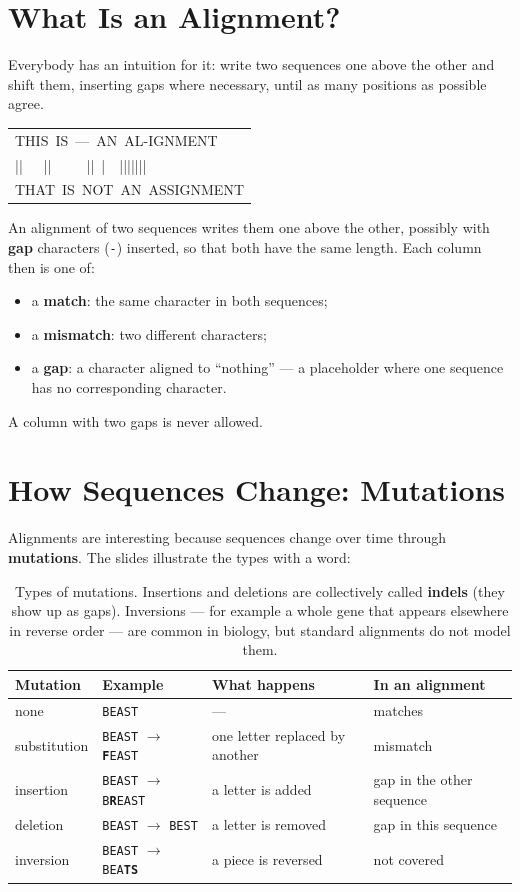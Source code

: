 \documentclass[11pt, oneside]{book}
\makeatletter
\newcommand{\seq}[1]{\texttt{#1}}
\newcommand{\alnblock}[1]{%
  \par\smallskip
  {\centering\ttfamily\small
   \begin{tabular}{@{}l@{}}#1\end{tabular}\par}%
  \smallskip}
\newcommand{\mm}[1]{\textcolor{thm@frame}{\textbf{#1}}}  %
\let\originalsection\section
\renewcommand{\section}{\Needspace{7\baselineskip}\originalsection}
\makeatother
\begin{document}
\section{What Is an Alignment?}

Everybody has an intuition for it: write two sequences one above the other
and shift them, inserting gaps where necessary, until as many positions as
possible agree.

\alnblock{%
THIS~IS~---~AN~AL-IGNMENT\\
||~~~||~~~~~||~|~~|||||||\\
THAT~IS~NOT~AN~ASSIGNMENT}

\begin{defbox}[title={Pairwise alignment}]
An alignment of two sequences writes them one above the other, possibly with
\textbf{gap} characters (\seq{-}) inserted, so that both have the same length.
Each column then is one of:
\begin{itemize}
  \item a \textbf{match}: the same character in both sequences;
  \item a \textbf{mismatch}: two different characters;
  \item a \textbf{gap}: a character aligned to ``nothing'' --- a placeholder
    where one sequence has no corresponding character.
\end{itemize}
A column with two gaps is never allowed.
\end{defbox}

\section{How Sequences Change: Mutations}

Alignments are interesting because sequences change over time through
\textbf{mutations}. The slides illustrate the types with a word:

\begin{table}[htbp]
\centering
\small
\begin{tabular}{@{}llll@{}}
\toprule
\textbf{Mutation} & \textbf{Example} & \textbf{What happens} & \textbf{In an alignment} \\
\midrule
none          & \seq{BEAST} & --- & matches \\
substitution  & \seq{BEAST} $\to$ \seq{\mm{F}EAST}  & one letter replaced by another & mismatch \\
insertion     & \seq{BEAST} $\to$ \seq{B\mm{R}EAST} & a letter is added & gap in the other sequence \\
deletion      & \seq{BEAST} $\to$ \seq{BEST}  & a letter is removed & gap in this sequence \\
inversion     & \seq{BEAST} $\to$ \seq{BEA\mm{TS}} & a piece is reversed & not covered \\
\bottomrule
\end{tabular}
\caption{Types of mutations. Insertions and deletions are collectively called
\textbf{indels} (they show up as gaps). Inversions --- for example a whole
gene that appears elsewhere in reverse order --- are common in biology, but
standard alignments do not model them.}
\label{tab:mutations}
\end{table}
\end{document}

